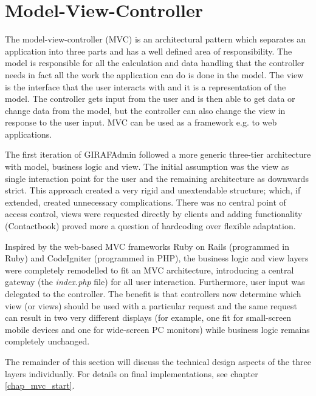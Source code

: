 \section{Model-View-Controller}
The model-view-controller (MVC) is an architectural pattern which separates an application into three parts and has a well defined area of responsibility. The model is responsible for all the calculation and data handling that the controller needs in fact all the work the application can do is done in the model. The view is the interface that the user interacts with and it is a representation of the model. The controller gets input from the user and is then able to get data or change data from the model, but the controller can also change the view in response to the user input\cite{vmc}. MVC can be used as a framework e.g. to web applications.

The first iteration of GIRAFAdmin followed a more generic three-tier architecture with model, business logic and view. The initial assumption was the view as single interaction point for the user and the remaining architecture as downwards strict. This approach created a very rigid and unextendable structure; which, if extended, created unnecessary complications. There was no central point of access control, views were requested directly by clients and adding functionality (Contactbook) proved more a question of hardcoding over flexible adaptation.

Inspired by the web-based MVC frameworks Ruby on Rails (programmed in Ruby) and CodeIgniter (programmed in PHP), the business logic and view layers were completely remodelled to fit an MVC architecture, introducing a central gateway (the \emph{index.php} file) for all user interaction. Furthermore, user input was delegated to the controller. The benefit is that controllers now determine which view (or views) should be used with a particular request and the same request can result in two very different displays (for example, one fit for small-screen mobile devices and one for wide-screen PC monitors) while business logic remains completely unchanged.

The remainder of this section will discuss the technical design aspects of the three layers individually. For details on final implementations, see chapter \vref{chap_mvc_start}.


